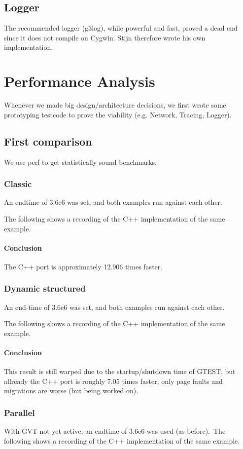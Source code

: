 \documentclass[8pt,a4paper]{report}
\begin{document}
\section{Logger}
The recommended logger (g3log), while powerful and fast, proved a dead end since it does not compile on Cygwin. 
Stijn therefore wrote his own implementation. %
\chapter{Performance Analysis}
Whenever we made big design/architecture decisions, we first wrote some prototyping testcode to prove the viability (e.g. Network, Tracing, Logger).
\section{First comparison}
We use perf to get statistically sound benchmarks.
\subsection{Classic}
An endtime of 3.6e6 was set, and both examples run against each other.

The following shows a recording of the C++ implementation of the same example.\\

\subsubsection{Conclusion}
The C++ port is approximately 12.906 times faster.

\subsection{Dynamic structured}
An end-time of 3.6e6 was set, and both examples run against each other.

The following shows a recording of the C++ implementation of the same example.\\

\subsubsection{Conclusion}
This result is still warped due to the startup/shutdown time of GTEST, but allready the C++ port is roughly 7.05 times faster, only page faults and migrations are worse (but being worked on).
\subsection{Parallel}
With GVT not yet active, an endtime of 3.6e6 was used (as before).\
The following shows a recording of the C++ implementation of the same example.\\

\end{document}
